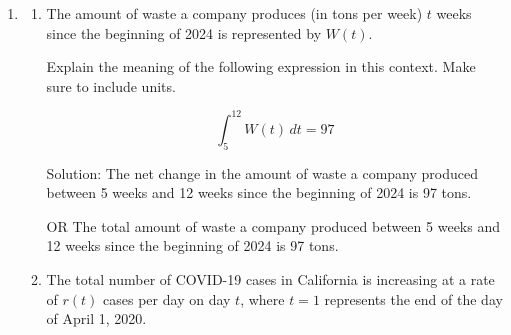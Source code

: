 \documentclass[11pt]{article}
\begin{document}
\begin{enumerate}
{\textbf{Alternative.} It is also possible to do the last part of this problem via the first derivative test for absolute extrema, since there is one critical value $\frac{400}{3}$ in the domain interval $[0, \frac{800}{3}]$.

We make a sign chart for $A'(x) = 400-3x$ by plugging in numbers from the two subintervals $(0,\frac{400}{3})$ and $(\frac{400}{3}, \frac{800}{3})$. $A'(1) = 397 > 0$; $A'(200) = -200 < 0$.  This means $A$ is increasing on $(0,\frac{400}{3})$ and decreasing on $(\frac{400}{3}, \frac{800}{3})$.  By the first derivative test for absolute extrema, $A$ has its absolute maximum when $\boxed{x = \frac{400}{3} \text{ ft}}$ and, using $y= 400 - \frac32 x$, $\boxed{y = 200 \text{ ft}}$.

This approach also works (and is the only valid option) if the domain is taken to be $(0, \frac{800}{3})$, as mentioned above.



}


\newpage


\item 

\begin{enumerate}
    \item The amount of waste a company produces (in tons per week) $t$ weeks since the beginning of 2024 is represented by $W(t)$.
    
    Explain the meaning of the following expression in this context. Make sure to include units.

    \[\int_5^{12}W(t)\,dt=97\]

    {\color{blue}Solution: The net change in the amount of waste a company produced between 5 weeks and 12 weeks since the beginning of 2024 is 97 tons.
    
    OR The total amount of waste a company produced between 5 weeks and 12 weeks since the beginning of 2024 is 97 tons.}

    \vfill

    \item The total number of COVID-19 cases in California is increasing at a rate of $r(t)$ cases per day on day $t$, where $t=1$ represents the end of the day of April 1, 2020.
    

\end{enumerate}
\end{enumerate}
\end{document}
